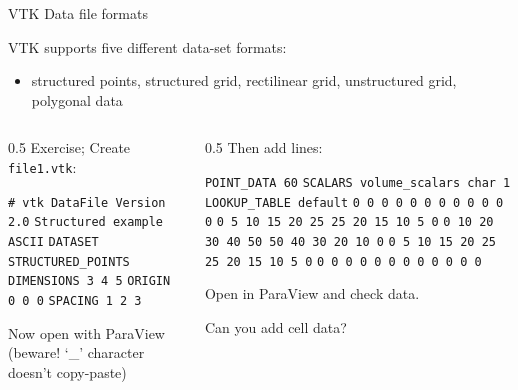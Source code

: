 \documentclass{beamer}
\begin{document}
\begin{frame}{VTK Data file formats}
    
    VTK supports five different data-set formats:
    \begin{itemize}
        \item structured points, structured grid, rectilinear grid, unstructured grid, polygonal data
    \end{itemize}{}
    
    \vskip 6pt
    
    \begin{columns}[t]
    \begin{column}{0.5\linewidth}
    Exercise; Create \texttt{file1.vtk}:
    
    \vskip 6pt
    
    \footnotesize
    \texttt{\# vtk DataFile Version 2.0}\newline
    \texttt{Structured example}\newline
    \texttt{ASCII}\newline
    \texttt{DATASET STRUCTURED\_POINTS}\newline
    \texttt{DIMENSIONS 3 4 5}\newline
    \texttt{ORIGIN 0 0 0}\newline
    \texttt{SPACING 1 2 3}\newline
    
    Now open with ParaView (beware! `\_' character doesn't copy-paste)
    \end{column}
    
    \begin{column}{0.5\linewidth}
    Then add lines:
    \vskip 6pt
    
    \footnotesize
    \texttt{POINT\_DATA 60}\newline
    \texttt{SCALARS volume\_scalars char 1}\newline
    \texttt{LOOKUP\_TABLE default}\newline
    {\tiny
    \texttt{0 0 0 0 0 0 0 0 0 0 0 0}\newline
    \texttt{0 5 10 15 20 25 25 20 15 10 5 0}\newline
    \texttt{0 10 20 30 40 50 50 40 30 20 10 0}\newline
    \texttt{0 5 10 15 20 25 25 20 15 10 5 0}\newline
    \texttt{0 0 0 0 0 0 0 0 0 0 0 0}\newline
    }
    
    Open in ParaView and check data.

    \vskip 6pt

    Can you add cell data?
    
    
    \end{column}
    \end{columns}

\end{frame}{}
\end{document}
